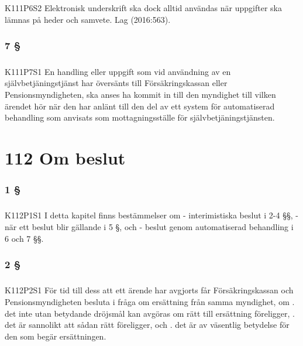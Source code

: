 \documentclass[a4paper,notitlepage,openany,10pt]{book}
\begin{document}
\paragraph*{}
{\tiny K111P6S2}
Elektronisk underskrift ska dock alltid användas när uppgifter ska lämnas på heder och samvete.
Lag (2016:563).
\subsection*{7 §}
\paragraph*{}
{\tiny K111P7S1}
En handling eller uppgift som vid användning av en självbetjäningstjänst har översänts till Försäkringskassan eller Pensionsmyndigheten, ska anses ha kommit in till den myndighet till vilken ärendet hör när den har anlänt till den del av ett system för automatiserad behandling som anvisats som mottagningsställe för självbetjäningstjänsten.
\chapter*{112 Om beslut}
\subsection*{1 §}
\paragraph*{}
{\tiny K112P1S1}
I detta kapitel finns bestämmelser om
\newline - interimistiska beslut i 2-4 §§,
\newline - när ett beslut blir gällande i 5 §, och
\newline - beslut genom automatiserad behandling i 6 och 7 §§.
\subsection*{2 §}
\paragraph*{}
{\tiny K112P2S1}
För tid till dess att ett ärende har avgjorts får Försäkringskassan och Pensionsmyndigheten besluta i fråga om ersättning från samma myndighet, om
. det inte utan betydande dröjsmål kan avgöras om rätt till ersättning föreligger,
. det är sannolikt att sådan rätt föreligger, och
. det är av väsentlig betydelse för den som begär ersättningen.
\end{document}
